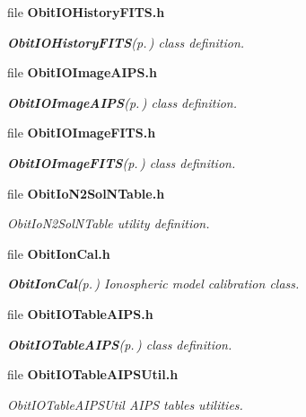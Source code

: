 \begin{CompactItemize}
\item 
file {\bf Obit\-IOHistory\-FITS.h}
\begin{CompactList}\small\item\em {\bf Obit\-IOHistory\-FITS}{\rm (p.\,\pageref{structObitIOHistoryFITS})} class definition. \item\end{CompactList}

\item 
file {\bf Obit\-IOImage\-AIPS.h}
\begin{CompactList}\small\item\em {\bf Obit\-IOImage\-AIPS}{\rm (p.\,\pageref{structObitIOImageAIPS})} class definition. \item\end{CompactList}

\item 
file {\bf Obit\-IOImage\-FITS.h}
\begin{CompactList}\small\item\em {\bf Obit\-IOImage\-FITS}{\rm (p.\,\pageref{structObitIOImageFITS})} class definition. \item\end{CompactList}

\item 
file {\bf Obit\-Io\-N2Sol\-NTable.h}
\begin{CompactList}\small\item\em Obit\-Io\-N2Sol\-NTable utility definition. \item\end{CompactList}

\item 
file {\bf Obit\-Ion\-Cal.h}
\begin{CompactList}\small\item\em {\bf Obit\-Ion\-Cal}{\rm (p.\,\pageref{structObitIonCal})} Ionospheric model calibration class. \item\end{CompactList}

\item 
file {\bf Obit\-IOTable\-AIPS.h}
\begin{CompactList}\small\item\em {\bf Obit\-IOTable\-AIPS}{\rm (p.\,\pageref{structObitIOTableAIPS})} class definition. \item\end{CompactList}

\item 
file {\bf Obit\-IOTable\-AIPSUtil.h}
\begin{CompactList}\small\item\em Obit\-IOTable\-AIPSUtil AIPS tables utilities. \item\end{CompactList}


\end{CompactItemize}
